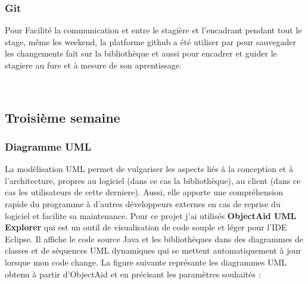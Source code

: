 \documentclass[12pt]{report}
\begin{document}
\subsubsection{Git}
Pour Facilité la communication et entre le stagière et l'encadrant pendant tout le stage, même les weekend, la platforme github a été utiliser par pour sauvegader les changements fait sur la bibliothèque et aussi pour encadrer et guider le stagiere au fure et à mesure de son aprentissage.

~\\
\subsection{Troisième semaine}

\subsubsection{Diagramme UML}

La modélisation UML permet de vulgariser les aspects liés à la conception et à l’architecture, propres au logiciel (dans ce cas la bibliothèque), au client (dans ce cas les utilisateurs de cette derniere). Aussi, elle apporte une compréhension rapide du programme à d’autres développeurs externes en cas de reprise du logiciel et facilite sa maintenance. \newline
Pour ce projet j'ai utilisés \textbf{ObjectAid UML Explorer} qui est un outil de visualisation de code souple et léger pour l'IDE Eclipse. Il affiche le code source Java et les bibliothèques dans des diagrammes de classes et de séquences UML dynamiques qui se mettent automatiquement à jour lorsque mon code change.
La figure suivante représante les diagrammes UML obtenu à partir d'ObjectAid et en précisant les paramètres souhaités :
\end{document}

